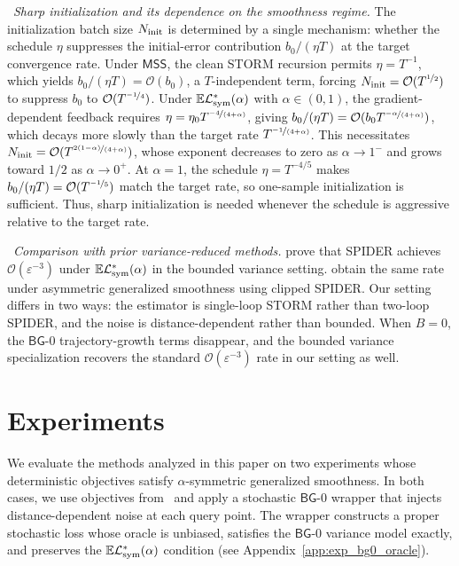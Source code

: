 \documentclass[letter,11pt]{article}
\newcommand{\E}{\mathbb{E}}
\newcommand{\Ocal}{\mathcal{O}}
\newcommand{\Lcal}{\mathcal{L}}
\begin{document}
\noindent \textbullet\ \textit{Sharp initialization and its dependence on the smoothness regime.} The initialization batch size $N_{\rm init}$ is determined by a single mechanism: whether the schedule $\eta$ suppresses the initial-error contribution $b_0/(\eta T)$ at the target convergence rate. Under $\mathsf{MSS}$, the clean STORM recursion permits $\eta = T^{-1}$, which yields $b_0/(\eta T) = \Ocal(b_0)$, a $T$-independent term, forcing $N_{\rm init} = \Ocal(T^{\nicefrac{1}{2}})$ to suppress $b_0$ to $\Ocal(T^{\nicefrac{-1}{4}})$. Under $\E\Lcal_{\rm sym}^*(\alpha)$ with $\alpha \in (0,1)$, the gradient-dependent feedback requires $\eta = \eta_0 T^{\nicefrac{-4}{(4+\alpha)}}$, giving ${b_0/(\eta T)} = \Ocal(b_0 T^{\nicefrac{-\alpha}{(4+\alpha)}})$, which decays more slowly than the target rate $T^{\nicefrac{-1}{(4+\alpha)}}$. This necessitates $N_{\rm init} = \Ocal(T^{\nicefrac{2(1-\alpha)}{(4+\alpha)}})$, whose exponent decreases to zero as $\alpha \to 1^-$ and grows toward $1/2$ as $\alpha \to 0^+$. At $\alpha = 1$, the schedule $\eta = T^{-4/5}$ makes $b_0/(\eta T) = \Ocal(T^{\nicefrac{-1}{5}})$ match the target rate, so one-sample initialization is sufficient. Thus, sharp initialization is needed whenever the schedule is aggressive relative to the target rate.

\noindent \textbullet\  \textit{Comparison with prior variance-reduced methods.}
\citet{chen2023generalized} prove that SPIDER achieves $\Ocal(\varepsilon^{-3})$ under $\E\Lcal_{\rm sym}^*(\alpha)$ in the bounded variance setting. \citet{reisizadeh2025variance} obtain the same rate under asymmetric generalized smoothness using clipped SPIDER. Our setting differs in two ways: the estimator is single-loop STORM rather than two-loop SPIDER, and the noise is distance-dependent rather than bounded. When $B=0$, the $\mathsf{BG}$-0 trajectory-growth terms disappear, and the bounded variance specialization recovers the standard $\Ocal(\varepsilon^{-3})$ rate in our setting as well. 
\section{Experiments}
\label{sec:exp}
We evaluate the methods analyzed in this paper on two experiments whose deterministic objectives satisfy $\alpha$-symmetric generalized smoothness. In both cases, we use objectives from~\citet{chen2023generalized} and apply a stochastic $\mathsf{BG}$-0 wrapper that injects distance-dependent noise at each query point. The
wrapper constructs a proper stochastic loss whose oracle is unbiased, satisfies the $\mathsf{BG}$-0 variance model exactly, and preserves the $\E\Lcal_{\rm sym}^*(\alpha)$ condition (see Appendix~\ref{app:exp_bg0_oracle}).
\end{document}
